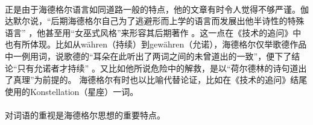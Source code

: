 \documentclass{article}
\begin{document}
		\paragraph{}
		正是由于海德格尔语言如同道路一般的特点，他的文章有时令人觉得不够严谨。伽达默尔说，“后期海德格尔自己为了逃避形而上学的语言而发展出他半诗性的特殊语言”
\cite{Text_Explain_DeFr}
，他甚至用“女巫式风格”来形容其后期著作
\cite[pg. 113]{Deonstr_DeFr}
。这一点在《技术的追问》中也有所体现。比如从währen（持续）到gewähren（允诺），海德格尔仅举歌德作品中一例用词，说歌德的“耳朵在此听出了两词之间的未曾道出的一致”，便下了结论“只有允诺者才持续”
。又比如他所说危险中的解救，是以“荷尔德林的诗句道出了真理”为前提的\cite{slct_Hei_Szx}。
海德格尔有时也以比喻代替论证，比如在《技术的追问》结尾使用的Konstellation（星座）一词。
		\paragraph{}
		对词语的重视是海德格尔思想的重要特点。
\renewcommand\refname{参考文献}


\end{document}
